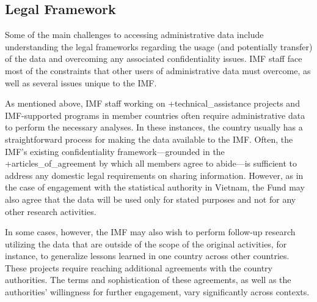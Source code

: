 \documentclass[
]{WileySix}
\begin{document}
\hypertarget{legal-framework}{%
\subsection{Legal Framework}\label{legal-framework}}

Some of the main challenges to accessing administrative data include understanding the legal frameworks regarding the usage (and potentially transfer) of the data and overcoming any associated confidentiality issues. IMF staff face most of the constraints that other users of administrative data must overcome, as well as several issues unique to the IMF.

As mentioned above, IMF staff working on +technical\_assistance\textbar{} projects and IMF-supported programs in member countries often require administrative data to perform the necessary analyses. In these instances, the country usually has a straightforward process for making the data available to the IMF. Often, the IMF's existing confidentiality framework---grounded in the +articles\_of\_agreement\textbar{} by which all members agree to abide---is sufficient to address any domestic legal requirements on sharing information. However, as in the case of engagement with the statistical authority in Vietnam, the Fund may also agree that the data will be used only for stated purposes and not for any other research activities.

In some cases, however, the IMF may also wish to perform follow-up research utilizing the data that are outside of the scope of the original activities, for instance, to generalize lessons learned in one country across other countries. These projects require reaching additional agreements with the country authorities. The terms and sophistication of these agreements, as well as the authorities' willingness for further engagement, vary significantly across contexts.
\end{document}

